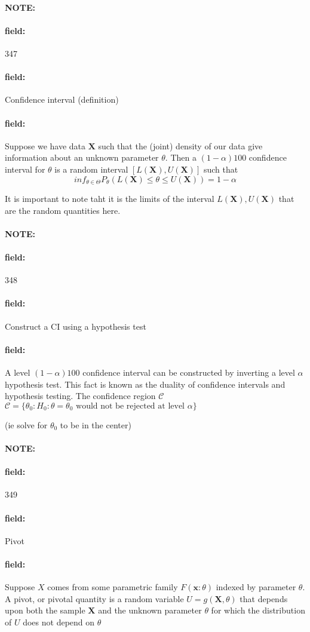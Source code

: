 \documentclass[12pt]{article}
\newenvironment{note}{\paragraph{NOTE:}}{}
\newenvironment{field}{\paragraph{field:}}{}
\begin{document}
\begin{note}
    \begin{field}
        \tiny 347
    \end{field}
    \begin{field}
        Confidence interval (definition)
    \end{field}
    \begin{field}
        Suppose we have data $\mathbf{X}$ such that the (joint) density of our data give information about an unknown parameter $\theta$. Then a $(1-\alpha)100$ confidence interval for $\theta$ is a random interval $[L(\mathbf{X}),U(\mathbf{X})]$ such that $$ inf_{\theta\in\Theta}P_\theta(L(\mathbf{X})\leq \theta \leq U(\mathbf{X})) = 1 - \alpha $$

        It is important to note taht it is the limits of the interval $L(\mathbf{X}), U(\mathbf{X})$ that are the random quantities here.
    \end{field}
\end{note}




\begin{note}
    \begin{field}
        \tiny 348
    \end{field}
    \begin{field}
        Construct a CI using a hypothesis test
    \end{field}
    \begin{field}
        A level $(1-\alpha)100$ confidence interval can be constructed by inverting a level $\alpha$ hypothesis test. This fact is known as the duality of confidence intervals and hypothesis testing.
        The confidence region $\mathscr{C}$ $\mathscr{C} = \{\theta_0: H_0: \theta = \theta_0 \text{ would not be rejected at level } \alpha \}$

        (ie solve for $\theta_0$ to be in the center)
    \end{field}
\end{note}


\begin{note}
    \begin{field}
        \tiny 349
    \end{field}
    \begin{field}
        Pivot
    \end{field}
    \begin{field}
        Suppose $X$ comes from some parametric family $F(\mathbf{x}:\theta)$ indexed by parameter $\theta$. A pivot, or pivotal quantity is a random variable $U = g(\mathbf{X},\theta)$ that depends upon both the sample $\mathbf{X}$ and the unknown parameter $\theta$ for which the distribution of $U$ does not depend on $\theta$
    \end{field}
\end{note}
\end{document}
